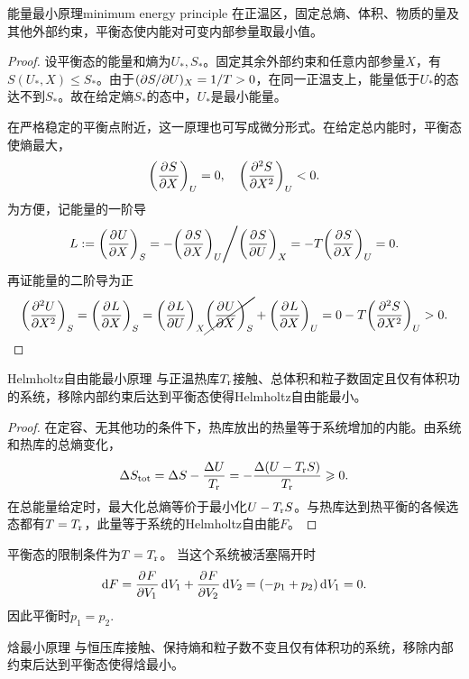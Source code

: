 \begin{theorem}
	{能量最小原理}{minimum energy principle}
	在正温区，固定总熵、体积、物质的量及其他外部约束，平衡态使内能对可变内部参量取最小值。
\end{theorem}

\begin{proof}
	设平衡态的能量和熵为$U_*,S_*$。固定其余外部约束和任意内部参量$X$，有$S(U_*,X) \le S_*$。由于$(\p S/\p U)_X = 1/T > 0$，在同一正温支上，能量低于$U_*$的态达不到$S_*$。故在给定熵$S_*$的态中，$U_*$是最小能量。

	在严格稳定的平衡点附近，这一原理也可写成微分形式。在给定总内能时，平衡态使熵最大，
	\begin{equation}
		\label{eq:sm-fixed-energy-entropy-maximum}
		\pvat{S}{X}{U} = 0,\quad\biggp{\pv[2]SX}_U < 0.
	\end{equation}
	为方便，记能量的一阶导
	\[
		L := \pvat{U}{X}{S} = -\Biggdivision{\pvat{S}{X}{U}}{\pvat{S}{U}{X}} = -T\pvat{S}{X}{U} = 0.
	\]
	再证能量的二阶导为正
	\[
		\biggp{\pv[2]UX}_S = \pvat{L}{X}{S} = \pvat{L}{U}{X}\cancel{\pvat{U}{X}{S}} + \pvat{L}{X}{U} = 0 - T\biggp{\pv[2]SX}_U > 0.
		\qedhere
	\]
\end{proof}

\begin{theorem}
	{Helmholtz自由能最小原理}{}
	与正温热库$T_\reservoir$接触、总体积和粒子数固定且仅有体积功的系统，移除内部约束后达到平衡态使得Helmholtz自由能最小。
\end{theorem}

\begin{proof}
	在定容、无其他功的条件下，热库放出的热量等于系统增加的内能。由系统和热库的总熵变化，
	\[
		\Delta S_\tot = \Delta S - \frac{\Delta U}{T_\reservoir}
		= -\frac{\Delta(U - T_\reservoir S)}{T_\reservoir} \geq 0 .
	\]
	在总能量给定时，最大化总熵等价于最小化$U - T_\reservoir S$。与热库达到热平衡的各候选态都有$T = T_\reservoir$，此量等于系统的Helmholtz自由能$F$。
	
\end{proof}

\begin{corollary}
	平衡态的限制条件为$T = T_\reservoir$。
	当这个系统被活塞隔开时
	\[
		\d F = \pv F{V_1}\d V_1 + \pv F{V_2}\d V_2 = (-p_1 + p_2)\d V_1 = 0.
	\]
	因此平衡时$p_1 = p_2.$
\end{corollary}

\begin{theorem}
	{焓最小原理}{}
	与恒压库接触、保持熵和粒子数不变且仅有体积功的系统，移除内部约束后达到平衡态使得焓最小。
\end{theorem}

